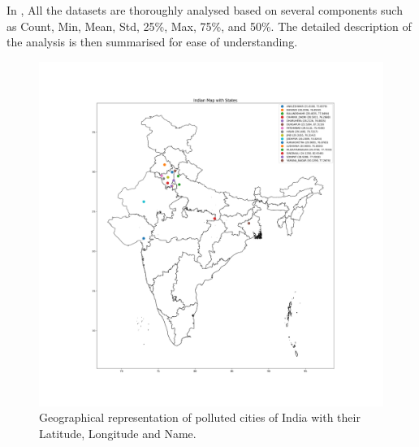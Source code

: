 \documentclass[a4paper, fleqn]{cas-sc}
\theoremstyle{definition}
\theoremstyle{remark}
\begin{document}
In , All the datasets are thoroughly analysed based on several components such as Count, Min,  Mean,  Std,   25\%, Max,  75\%,  and 50\%. The detailed description of the analysis is then summarised for ease of understanding.
\begin{figure}[h!]
	\centering
		\includegraphics[scale=0.3]{india_map}
	  \caption{Geographical representation of polluted cities of India with their Latitude,  Longitude and Name. }\label{India map}
\end{figure}
\end{document}
